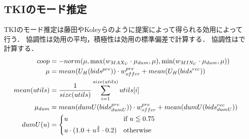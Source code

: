 \subsection{TKIのモード推定}
TKIのモード推定は藤田\cite{tki-aa}やKoleyら\cite{tki-ha}のように提案によって得られる効用によって行う．
協調性は効用の平均，積極性は効用の標準偏差で計算する．
協調性はで計算する．
\begin{align}
    coop &= -norm(\mu, \max (w_{MAX_U} \cdot \mu_{dum}, \mu), \min (w_{MIN_U} \cdot \mu_{dum}, \mu)) \label{eq:cooperativeness} \\
    \mu &= mean(U_H(bids^{pre})) \cdot w_{offer}^{pre} + mean(U_H(bids^{rec})) \nonumber \\
    mean(utils) &= \frac{1}{size(utils)}\sum_{i = 1}^{size(utils)} utils[i] \nonumber \\
    \mu_{dum} &= mean(dumU(bids_{dumU}^{pre})) \cdot w_{offer}^{pre} + mean(dumU(bids_{dumU}^{rec})) \nonumber \\
    dumU(u) &=
    \begin{cases*}
        u & if $u \leqq 0.75$ \\
        u \cdot (1.0 + u^{\frac{3}{2}} \cdot 0.2) & otherwise \\
    \end{cases*} \label{eq:dummyMean}
\end{align}


